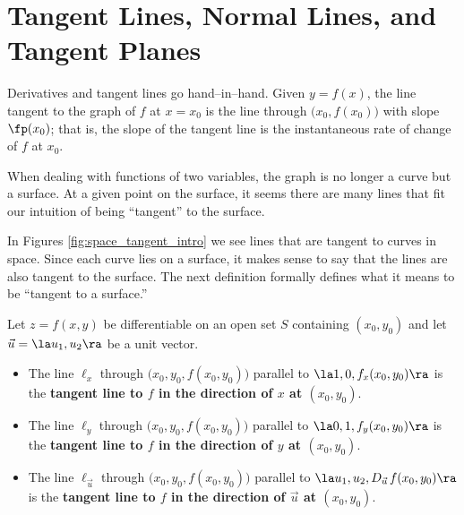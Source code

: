 \section{Tangent Lines, Normal Lines, and Tangent Planes}\label{sec:multi_tangent}

Derivatives and tangent lines go hand--in--hand. Given $y=f(x)$, the line tangent to the graph of $f$ at $x=x_0$ is the line through $\big(x_0,f(x_0)\big) $ with slope $\fp(x_0)$; that is, the slope of the tangent line is the instantaneous rate of change of $f$ at $x_0$. 

When dealing with functions of two variables, the graph is no longer a curve but a surface. At a given point on the surface, it seems there are many lines that fit our intuition of being ``tangent'' to the surface. 


In Figures \ref{fig:space_tangent_intro} we see lines that are tangent to curves in space. Since each curve lies on a  surface, it makes sense to say that the lines are also tangent to the surface. The next definition formally defines what it means to be ``tangent to a surface.'' %

\setboxwidth{10pt}
{Let $z=f(x,y)$ be differentiable on an open set $S$ containing $(x_0,y_0)$ and let $\vec u = \la u_1, u_2\ra$ be a unit vector.
\begin{itemize}
	\item The line $\ell_x$ through $\big(x_0,y_0,f(x_0,y_0)\big)$ parallel to $\la 1,0,f_x(x_0,y_0)\ra$	is the \textbf{tangent line to $f$ in the direction of $x$ at $(x_0,y_0)$}.
	
	\item The line $\ell_y$  through $\big(x_0,y_0,f(x_0,y_0)\big)$ parallel to $\la 0,1,f_y(x_0,y_0)\ra$	is the \textbf{tangent line to $f$ in the direction of $y$ at $(x_0,y_0)$}.
	
	\item	 The line $\ell_{\vec u}$ through $\big(x_0,y_0,f(x_0,y_0)\big)$ parallel to $\la u_1,u_2,D_{\vec u\,}f(x_0,y_0)\ra$	is the \textbf{tangent line to $f$ in the direction of $\vec u$ at $(x_0,y_0)$}.
	\end{itemize}
}
\restoreboxwidth

